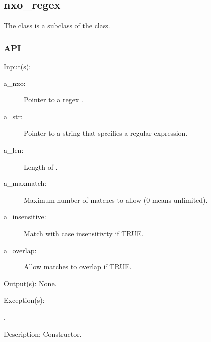 %
%
%
%
%              

\subsection{nxo\_regex}
\label{nxo_regex}

The  class is a subclass of the  class.

\subsubsection{API}
\begin{capi}
\label{nxo_regex_new}
	\begin{capilist}
	\item[Input(s): ]
		\begin{description}\item[]
		\item[a\_nxo: ]
			Pointer to a regex .
		\item[a\_str: ]
			Pointer to a string that specifies a regular expression.
		\item[a\_len: ]
			Length of .
		\item[a\_maxmatch: ]
			Maximum number of matches to allow (0 means unlimited).
		\item[a\_insensitive: ]
			Match with case insensitivity if TRUE.
		\item[a\_overlap: ]
			Allow matches to overlap if TRUE.
		\end{description}
	\item[Output(s): ] None.
	\item[Exception(s): ]
		\begin{description}\item[]
		\item[.]
		\end{description}
	\item[Description: ]
		Constructor.
	\end{capilist}
\end{capi}
